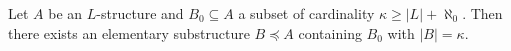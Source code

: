 Let $A$ be an $L$-structure and $B_0 \subseteq A$ a subset of cardinality $\kappa \geq |L| + \aleph_0$. Then there exists an elementary substructure $B \preceq A$ containing $B_0$ with $|B| = \kappa$.
